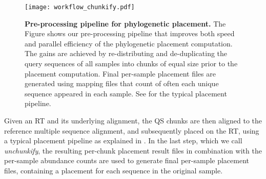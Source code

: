 \begin{figure}[hpbt]
    \centering
    \texttt{[image: workflow\_chunkify.pdf]}
    \caption[Pre-processing pipeline for phylogenetic placement]{
        \textbf{Pre-processing pipeline for phylogenetic placement.}
        The Figure shows our pre-processing pipeline that improves both speed and parallel efficiency
        of the phylogenetic placement computation.
        The gains are achieved by re-distributing and de-duplicating the query sequences of all samples
        into chunks of equal size prior to the placement computation.
        Final per-sample placement files are generated using mapping files
        that count of often each unique sequence appeared in each sample.
        See  for the typical placement pipeline.
    }
    \label{fig:workflow_chunkify}
\end{figure}

Given an \ac{RT} and its underlying alignment,
the \ac{QS} chunks are then aligned to the reference multiple sequence alignment,
and subsequently placed on the \ac{RT}, using a typical placement pipeline
as explained in .
In the last step, which we call \emph{unchunkify},
the resulting per-chunk placement result files in combination with the per-sample abundance counts
are used to generate final per-sample placement files,
containing a placement for each sequence in the original sample.

